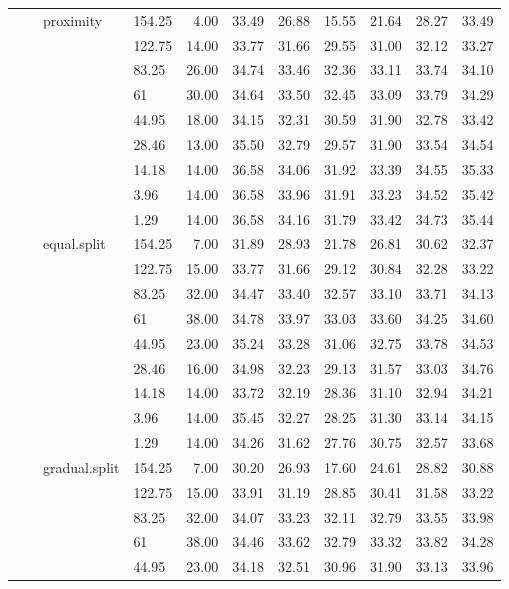 \begin{longtable}{llllrrrrrrr}
   &  & proximity & 154.25 & 4.00 & 33.49 & 26.88 & 15.55 & 21.64 & 28.27 & 33.49 \\ 
   &  &  & 122.75 & 14.00 & 33.77 & 31.66 & 29.55 & 31.00 & 32.12 & 33.27 \\ 
   &  &  & 83.25 & 26.00 & 34.74 & 33.46 & 32.36 & 33.11 & 33.74 & 34.10 \\ 
   &  &  & 61 & 30.00 & 34.64 & 33.50 & 32.45 & 33.09 & 33.79 & 34.29 \\ 
   &  &  & 44.95 & 18.00 & 34.15 & 32.31 & 30.59 & 31.90 & 32.78 & 33.42 \\ 
   &  &  & 28.46 & 13.00 & 35.50 & 32.79 & 29.57 & 31.90 & 33.54 & 34.54 \\ 
   &  &  & 14.18 & 14.00 & 36.58 & 34.06 & 31.92 & 33.39 & 34.55 & 35.33 \\ 
   &  &  & 3.96 & 14.00 & 36.58 & 33.96 & 31.91 & 33.23 & 34.52 & 35.42 \\ 
   &  &  & 1.29 & 14.00 & 36.58 & 34.16 & 31.79 & 33.42 & 34.73 & 35.44 \\ 
   &  & equal.split & 154.25 & 7.00 & 31.89 & 28.93 & 21.78 & 26.81 & 30.62 & 32.37 \\ 
   &  &  & 122.75 & 15.00 & 33.77 & 31.66 & 29.12 & 30.84 & 32.28 & 33.22 \\ 
   &  &  & 83.25 & 32.00 & 34.47 & 33.40 & 32.57 & 33.10 & 33.71 & 34.13 \\ 
   &  &  & 61 & 38.00 & 34.78 & 33.97 & 33.03 & 33.60 & 34.25 & 34.60 \\ 
   &  &  & 44.95 & 23.00 & 35.24 & 33.28 & 31.06 & 32.75 & 33.78 & 34.53 \\ 
   &  &  & 28.46 & 16.00 & 34.98 & 32.23 & 29.13 & 31.57 & 33.03 & 34.76 \\ 
   &  &  & 14.18 & 14.00 & 33.72 & 32.19 & 28.36 & 31.10 & 32.94 & 34.21 \\ 
   &  &  & 3.96 & 14.00 & 35.45 & 32.27 & 28.25 & 31.30 & 33.14 & 34.15 \\ 
   &  &  & 1.29 & 14.00 & 34.26 & 31.62 & 27.76 & 30.75 & 32.57 & 33.68 \\ 
   &  & gradual.split & 154.25 & 7.00 & 30.20 & 26.93 & 17.60 & 24.61 & 28.82 & 30.88 \\ 
   &  &  & 122.75 & 15.00 & 33.91 & 31.19 & 28.85 & 30.41 & 31.58 & 33.22 \\ 
   &  &  & 83.25 & 32.00 & 34.07 & 33.23 & 32.11 & 32.79 & 33.55 & 33.98 \\ 
   &  &  & 61 & 38.00 & 34.46 & 33.62 & 32.79 & 33.32 & 33.82 & 34.28 \\ 
   &  &  & 44.95 & 23.00 & 34.18 & 32.51 & 30.96 & 31.90 & 33.13 & 33.96 \\ 

\end{longtable}
